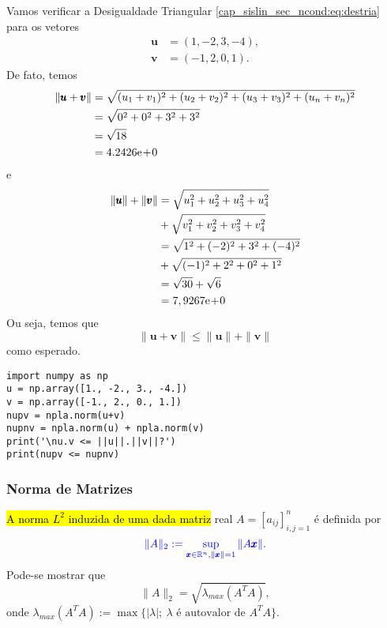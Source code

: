 \begin{ex}
  Vamos verificar a Desigualdade Triangular \eqref{cap_sislin_sec_ncond:eq:destria} para os vetores
  \begin{align}
    \pmb{u} &= (1, -2, 3, -4),\\
    \pmb{v} &= (-1, 2, 0, 1).    
  \end{align}
  De fato, temos
  \begin{align}
    \|\pmb{u}+\pmb{v}\| &= \sqrt{(u_1+v_1)^2 + (u_2+v_2)^2 + (u_3+v_3)^2 + (u_n+v_n)^2}\\
                        &= \sqrt{0^2 + 0^2 + 3^2 + 3^2}\\
                        &= \sqrt{18}\\
                        &= 4.2426\mathrm{e}\!+\!0
  \end{align}
  e
  \begin{align}
    \|\pmb{u}\|+\|\pmb{v}\| &= \sqrt{u_1^2 + u_2^2 + u_3^2 + u_4^2} \nonumber\\
                            &+ \sqrt{v_1^2 + v_2^2 + v_3^2 + v_4^2}\\
                            &= \sqrt{1^2 + (-2)^2 + 3^2 + (-4)^2} \nonumber\\
                            &+ \sqrt{(-1)^2 + 2^2 + 0^2 + 1^2}\\
                            &= \sqrt{30} + \sqrt{6}\\
                            &= 7,9267\mathrm{e}\!+\!0
  \end{align}
  Ou seja, temos que
  \begin{equation}
    \|\pmb{u}+\pmb{v}\| \leq \|\pmb{u}\|+\|\pmb{v}\| 
  \end{equation}
  como esperado.

\begin{lstlisting}
import numpy as np
u = np.array([1., -2., 3., -4.])
v = np.array([-1., 2., 0., 1.])
nupv = npla.norm(u+v)
nupnv = npla.norm(u) + npla.norm(v)
print('\nu.v <= ||u||.||v||?')
print(nupv <= nupnv)
\end{lstlisting}

\end{ex}

\subsubsection{Norma de Matrizes}

\hl{A norma $L^2$ induzida de uma dada matriz} real $A = [a_{ij}]_{i,j=1}^n$ é definida por
\begin{equation}\color{blue}\|A\|_2 := \sup_{\pmb{x}\in\mathbb{R}^n, \|\pmb{x}\|=1} \|A\pmb{x}\|.
\end{equation}
Pode-se mostrar que
\begin{equation}
  \|A\|_2 = \sqrt{\lambda_{max}(A^TA)},
\end{equation}
onde $\lambda_{max}(A^TA) := \max\{|\lambda|;~\lambda\text{ é autovalor de }A^TA\}$.

